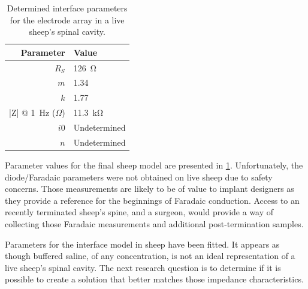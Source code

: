     \begin{table}
      \caption{Determined interface parameters for the electrode array in a live sheep's spinal cavity.}
      \label{tab:ModelParameters_sheep}
      \begin{center}
        \begin{tabular}{r | l}
            Parameter & Value \\
            \hline

            $R_{S}$ & \SI{126}{\ohm} \\

            $m$& 1.34\\
            $k$ & 1.77\\
            |Z| @ \SI{1}{\hertz} ($\Omega$)& \SI{11.3}{\kilo\ohm} \\

            $i0$ & Undetermined\\
            $n$ & Undetermined\\
        \end{tabular}
      \end{center}
    \end{table}
    Parameter values for the final sheep model are presented in \cref{tab:ModelParameters_sheep}.
    Unfortunately, the diode/Faradaic parameters were not obtained on live sheep due to safety concerns.
    Those measurements are likely to be of value to implant designers as they provide a reference for the beginnings of Faradaic conduction.
    Access to an recently terminated sheep's spine, and a surgeon, would provide a way of collecting those Faradaic measurements and additional post-termination samples.

    Parameters for the interface model in sheep have been fitted.
    It appears as though buffered saline, of any concentration, is not an ideal representation of a live sheep's spinal cavity.
    The next research question is to determine if it is possible to create a solution that better matches those impedance characteristics.
